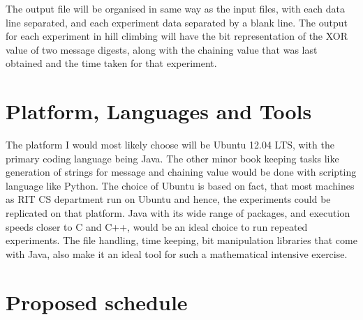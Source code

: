 The output file will be organised in same way as the input files, with each data line separated, and 
each experiment data separated by a blank line. The output for each experiment in hill climbing will
have the bit representation of the XOR value of two message digests, along with the chaining value
that was last obtained and the time taken for that experiment.

\section{Platform, Languages and Tools}

The platform I would most likely choose will be Ubuntu 12.04 LTS, with the primary coding language
being Java. The other minor book keeping tasks like generation of strings for message and chaining
value would be done with scripting language like Python. The choice of Ubuntu is based on fact, that
most machines as RIT CS department run on Ubuntu and hence, the experiments could be replicated
on that platform. Java with its wide range of packages, and execution speeds closer to C and C++,
would be an ideal choice to run repeated experiments. The file handling, time keeping, bit 
manipulation libraries that come with Java, also make it an ideal tool for such a mathematical 
intensive exercise.

\newpage

\section{Proposed schedule}

